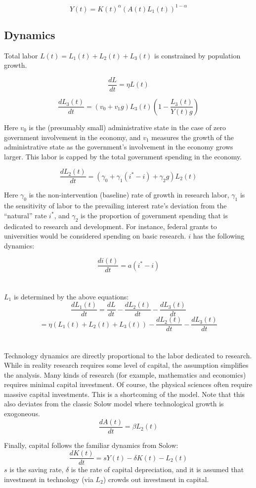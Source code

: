\documentclass[12pt]{article}
\theoremstyle{definition}
\begin{document}
\[Y(t)=K(t)^\alpha (A(t)L_1(t))^{1-\alpha}\]

\subsection{Dynamics}

Total labor \(L(t)=L_1(t)+L_2(t)+L_3(t)\) is constrained by population growth.

\[\frac{dL}{dt}=\eta L(t)\]

\[\frac{dL_3(t)}{dt}=\left(v_0+v_1g\right)L_3(t)\left(1-\frac{L_3(t)}{Y(t)g}\right) \]

Here \(v_0\) is the (presumably small) administrative state in the case of zero government involvement in the economy, and \(v_1\) measures the growth of the administrative state as the government's involvement in the economy grows larger.  This labor is capped by the total government spending in the economy.

\[\frac{dL_2(t)}{dt}=\left(\gamma_0+\gamma_1 (i^*-i) +\gamma_2 g\right) L_2(t) \]

Here \(\gamma_0\) is the non-intervention (baseline) rate of growth in research labor, \(\gamma_1\) is the sensitivity of labor to the prevailing interest rate's deviation from the ``natural'' rate \(i^*\), and \(\gamma_2\) is the proportion of government spending that is dedicated to research and development.  For instance, federal grants to universities would be considered spending on basic research.  \(i\) has the following dynamics:

\[\frac{di(t)}{dt}=a\left(i^*-i\right)\]
\\
\\
\(L_1\) is determined by the above equations:
\[\frac{dL_1(t)}{dt}=\frac{dL}{dt}-\frac{dL_2(t)}{dt}-\frac{dL_3(t)}{dt}\] 
\[=\eta\left(L_1(t)+L_2(t)+L_3(t)\right)-\frac{dL_2(t)}{dt}-\frac{dL_3(t)}{dt}\]
\\
\\
Technology dynamics are directly proportional to the labor dedicated to research.  While in reality research requires some level of capital, the assumption simplifies the analysis.  Many kinds of research (for example, mathematics and economics) requires minimal capital investment.  Of course, the physical sciences often require massive capital investments.  This is a shortcoming of the model.  Note that this also deviates from the classic Solow model where technological growth is exogoneous.
\[\frac{dA(t)}{dt}=\beta L_2(t)\]

Finally, capital follows the familiar dynamics from Solow:
\[\frac{dK(t)}{dt}=s Y(t) - \delta K(t)- L_2(t)\]
\(s\) is the saving rate, \(\delta\) is the rate of capital depreciation, and it is assumed that investment in technology (via \(L_2\)) crowds out investment in capital.  
\end{document}
